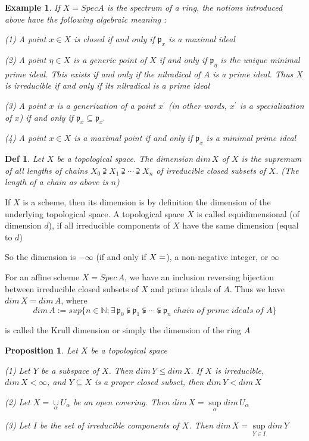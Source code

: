 \documentclass{article}
\newtheorem{definition}[theorem]{Def}
\newtheorem{example}[theorem]{Example}
\newtheorem{proposition}[theorem]{Proposition}
\begin{document}
\begin{example}
    If $X = Spec A$ is the spectrum of a ring, the notions introduced above have the following algebraic meaning :
    
(1) A point $x \in X$ is closed if and only if $\mathfrak p_x$ is a maximal ideal

(2) A point $\eta \in X$ is a generic point of $X$ if and only if $\mathfrak p_\eta$ is the unique minimal prime ideal. This exists if and only if the nilradical of $A$ is a prime ideal. Thus $X$ is irreducible if and only if its nilradical is a prime
ideal

(3) A point $x$ is a generization of a point $x^\prime$ (in other words, $x^\prime$ is a specialization of $x$) if and only if $\mathfrak p_x \subseteq \mathfrak p_{x^\prime}$

(4) A point $x \in X$ is a maximal point if and only if $\mathfrak p_x$ is a minimal prime ideal
\end{example}

\begin{definition}
    Let $X$ be a topological space. The dimension $dim\, X$ of $X$ is the supremum of all lengths of chains
$X_0 \supsetneqq X_1 \supsetneqq \cdots \supsetneqq X_n$
of irreducible closed subsets of $X$. (The length of a chain as above is $n$) 
\end{definition}

If $X$ is a scheme,
then its dimension is by definition the dimension of the underlying topological space. A
topological space $X$ is called equidimensional (of dimension $d$), if all irreducible components of $X$ have the same dimension (equal to $d$)

So the dimension is $−\infty$ (if and only if $X = \empty$), a non-negative integer, or $\infty$

For an affine scheme $X = Spec\, A$, we have an inclusion reversing bijection between
irreducible closed subsets of $X$ and prime ideals of $A$. Thus we have
$dim\, X = dim\, A$, where
$$
dim\, A := sup\{n \in \mathbb N ; \exists\, \mathfrak p_0 \subsetneqq \mathfrak p_1 \subsetneqq \cdots \subsetneqq \mathfrak p_n\; chain\; of\; prime\; ideals\; of\; A\}
$$

is called the Krull dimension or simply the dimension of the ring $A$

\begin{proposition}
    Let $X$ be a topological space
    
(1) Let $Y$ be a subspace of $X$. Then $dim\, Y \leq dim\, X$. If $X$ is irreducible, $dim\, X < \infty$,
and $Y \subseteq X$ is a proper closed subset, then $dim\, Y < dim\, X$

(2) Let $X =\mathop{\cup}\limits_\alpha U_\alpha$ be an open covering. Then
$dim\, X = \mathop{sup}\limits_\alpha
dim\, U_\alpha$

(3) Let $I$ be the set of irreducible components of $X$. Then
$dim\, X = \mathop{sup}\limits_{Y \in I} dim\, Y$
\end{proposition}
\end{document}
